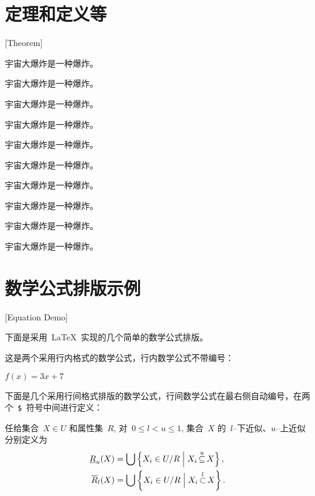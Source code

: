 \section{定理和定义等}[Theorem]
\begin{theorem}
  宇宙大爆炸是一种爆炸。
\end{theorem}
\begin{definition}[（霍金）]
  宇宙大爆炸是一种爆炸。
\end{definition}
\begin{assumption}
  宇宙大爆炸是一种爆炸。
\end{assumption}
\begin{lemma}
  宇宙大爆炸是一种爆炸。
\end{lemma}
\begin{corollary}
  宇宙大爆炸是一种爆炸。
\end{corollary}
\begin{exercise}
  宇宙大爆炸是一种爆炸。
\end{exercise}
\begin{problem}
宇宙大爆炸是一种爆炸。
\end{problem}
\begin{remark}
  宇宙大爆炸是一种爆炸。
\end{remark}
\begin{axiom}[（爱因斯坦）]
  宇宙大爆炸是一种爆炸。
\end{axiom}
\begin{conjecture}
  宇宙大爆炸是一种爆炸。
\end{conjecture}

\section{数学公式排版示例}[Equation Demo]

下面是采用~\LaTeX~实现的几个简单的数学公式排版。

这是两个采用行内格式的数学公式，行内数学公式不带编号：

$f(x) = 3x + 7$

下面是几个采用行间格式排版的数学公式，行间数学公式在最右侧自动编号，在两个~\verb|$|~符号中间进行定义：

\begin{definition}
  任给集合~$X \in U$ 和属性集~$R$, 对~$0\leqslant l < u \leqslant 1$,
  集合~$X$ 的~$l${--}下近似、$u${--}上近似分别定义为
  \begin{align}
    \underline {R} _u (X) & =  \bigcup \left\{ {X_i  \in U/R\Bigm|X_i \mathop  \subseteq \limits^u  X} \right\}, \\
    \overline {R} _l (X)  & =  \bigcup \left\{ {X_i  \in U/R\Bigm|X_i \mathop  \subset \limits^l X} \right\}.
  \end{align}
\end{definition}

